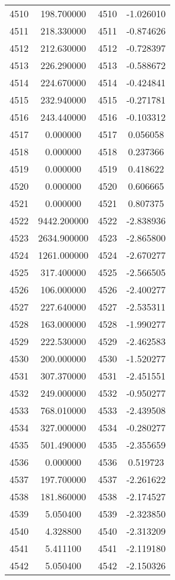 \documentclass[12pt]{article}
\begin{document}
\begin{longtable}{@{}cccc@{}}
4510 & 198.700000 & 4510 & -1.026010 \\
4511 & 218.330000 & 4511 & -0.874626 \\
4512 & 212.630000 & 4512 & -0.728397 \\
4513 & 226.290000 & 4513 & -0.588672 \\
4514 & 224.670000 & 4514 & -0.424841 \\
4515 & 232.940000 & 4515 & -0.271781 \\
4516 & 243.440000 & 4516 & -0.103312 \\
4517 & 0.000000 & 4517 & 0.056058 \\
4518 & 0.000000 & 4518 & 0.237366 \\
4519 & 0.000000 & 4519 & 0.418622 \\
4520 & 0.000000 & 4520 & 0.606665 \\
4521 & 0.000000 & 4521 & 0.807375 \\
4522 & 9442.200000 & 4522 & -2.838936 \\
4523 & 2634.900000 & 4523 & -2.865800 \\
4524 & 1261.000000 & 4524 & -2.670277 \\
4525 & 317.400000 & 4525 & -2.566505 \\
4526 & 106.000000 & 4526 & -2.400277 \\
4527 & 227.640000 & 4527 & -2.535311 \\
4528 & 163.000000 & 4528 & -1.990277 \\
4529 & 222.530000 & 4529 & -2.462583 \\
4530 & 200.000000 & 4530 & -1.520277 \\
4531 & 307.370000 & 4531 & -2.451551 \\
4532 & 249.000000 & 4532 & -0.950277 \\
4533 & 768.010000 & 4533 & -2.439508 \\
4534 & 327.000000 & 4534 & -0.280277 \\
4535 & 501.490000 & 4535 & -2.355659 \\
4536 & 0.000000 & 4536 & 0.519723 \\
4537 & 197.700000 & 4537 & -2.261622 \\
4538 & 181.860000 & 4538 & -2.174527 \\
4539 & 5.050400 & 4539 & -2.323850 \\
4540 & 4.328800 & 4540 & -2.313209 \\
4541 & 5.411100 & 4541 & -2.119180 \\
4542 & 5.050400 & 4542 & -2.150326 \\

\end{longtable}
\end{document}
